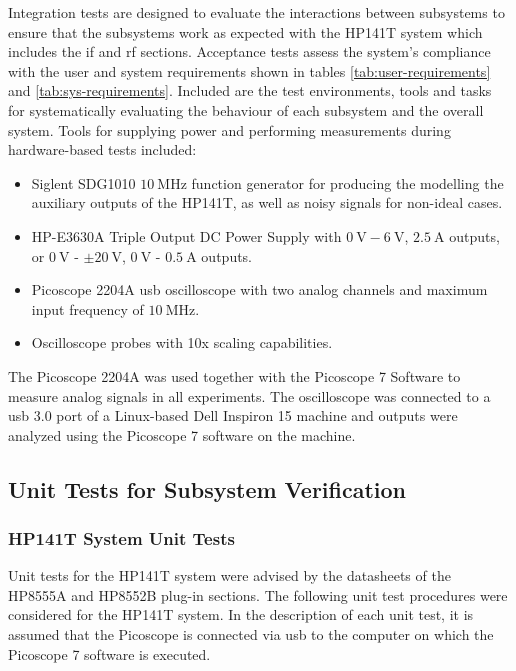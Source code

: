 \documentclass[class=report,11pt,crop=false]{standalone}
\begin{document}
	Integration tests are designed to evaluate the interactions between subsystems to ensure that the subsystems work as expected with the HP141T system which includes the \acrshort{if} and \acrshort{rf} sections. Acceptance tests assess the system's compliance with the user and system requirements shown in tables \ref{tab:user-requirements} and \ref{tab:sys-requirements}. Included are the test environments, tools and tasks for systematically evaluating the behaviour of each subsystem and the overall system. Tools for supplying power and performing measurements during hardware-based tests included:
	\begin{itemize}
		\item 
		Siglent SDG1010 $\SI{10}{\mega\hertz}$ function generator for producing the modelling the auxiliary outputs of the HP141T, as well as noisy signals for non-ideal cases.
		\item 
		HP-E3630A Triple Output DC Power Supply with $\SI{0}{\volt}-\SI{6}{\volt}$, $\SI{2.5}{\ampere}$ outputs, or $\SI{0}{\volt}$ - $\pm\SI{20}{\volt}$, $\SI{0}{\volt}$ - $\SI{0.5}{\ampere}$ outputs.
		\item 
		Picoscope 2204A \acrshort{usb} oscilloscope with two analog channels and maximum input frequency of $\SI{10}{\mega\hertz}$.
		\item 
		Oscilloscope probes with 10x scaling capabilities.
	\end{itemize}
	The Picoscope 2204A was used together with the Picoscope 7 Software to measure analog signals in all experiments. The oscilloscope was connected to a \acrshort{usb} 3.0 port of a Linux-based Dell Inspiron 15 machine and outputs were analyzed using the Picoscope 7 software on the machine. 
	\subsection{Unit Tests for Subsystem Verification}
	\subsubsection{HP141T System Unit Tests}
	Unit tests for the HP141T system were advised by the datasheets of the HP8555A and HP8552B plug-in sections. The following unit test procedures were considered for the HP141T system. In the description of each unit test, it is assumed that the Picoscope is connected via \acrshort{usb} to the computer on which the Picoscope 7 software is executed.
	
\end{document}

